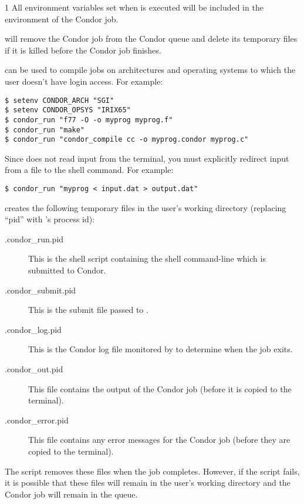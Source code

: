 \begin{ManPage}{\label{man-condor-run}}{1}
All environment variables set when  is executed will be
included in the environment of the Condor job.

 will remove the Condor job from the Condor queue and
delete its temporary files if it is killed before the Condor job
finishes.

\Examples

 can be used to compile jobs on architectures and
operating systems to which the user doesn't have login access.  For example:

\begin{verbatim}
$ setenv CONDOR_ARCH "SGI"
$ setenv CONDOR_OPSYS "IRIX65"
$ condor_run "f77 -O -o myprog myprog.f"
$ condor_run "make"
$ condor_run "condor_compile cc -o myprog.condor myprog.c"
\end{verbatim}

Since  does not read input from the terminal, you must
explicitly redirect input from a file to the shell command.  For
example:

\begin{verbatim}
$ condor_run "myprog < input.dat > output.dat"
\end{verbatim}

\Files

 creates the following temporary files in the user's
working directory (replacing ``pid'' with 's process id):
\begin{description}
\item[.condor\_run.pid] This is the shell script containing the shell
command-line which is submitted to Condor.
\item[.condor\_submit.pid] This is the submit file passed to
. 
\item[.condor\_log.pid] This is the Condor log file monitored by
 to determine when the job exits.
\item[.condor\_out.pid] This file contains the output of the Condor
job (before it is copied to the terminal).
\item[.condor\_error.pid] This file contains any error messages for the Condor
job (before they are copied to the terminal).
\end{description}
The script removes these files when the job completes.  However, if
the script fails, it is possible that these files will remain in the
user's working directory and the Condor job will remain in the queue.

\GenRem


\end{ManPage}
